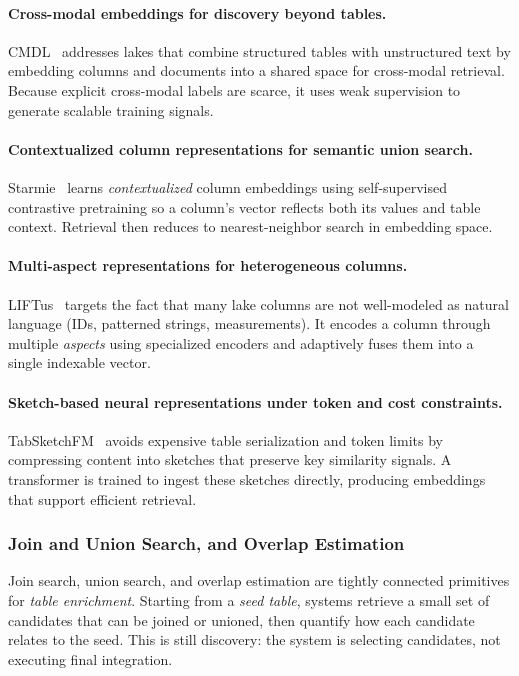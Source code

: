 \documentclass[sigconf,nonacm]{acmart}
\begin{document}
\paragraph{Cross-modal embeddings for discovery beyond tables.}
CMDL~\cite{10.14778/3611479.3611533} addresses lakes that combine structured tables with unstructured text by embedding columns and documents into a shared space for cross-modal retrieval. Because explicit cross-modal labels are scarce, it uses weak supervision to generate scalable training signals.

\paragraph{Contextualized column representations for semantic union search.}
Starmie~\cite{10.14778/3587136.3587146} learns \emph{contextualized} column embeddings using self-supervised contrastive pretraining so a column's vector reflects both its values and table context. Retrieval then reduces to nearest-neighbor search in embedding space.

\paragraph{Multi-aspect representations for heterogeneous columns.}
LIFTus~\cite{11113165} targets the fact that many lake columns are not well-modeled as natural language (IDs, patterned strings, measurements). It encodes a column through multiple \emph{aspects} using specialized encoders and adaptively fuses them into a single indexable vector.

\paragraph{Sketch-based neural representations under token and cost constraints.}
TabSketchFM~\cite{11113110} avoids expensive table serialization and token limits by compressing content into sketches that preserve key similarity signals. A transformer is trained to ingest these sketches directly, producing embeddings that support efficient retrieval.

\subsubsection{Join and Union Search, and Overlap Estimation}
Join search, union search, and overlap estimation are tightly connected primitives for \emph{table enrichment}. Starting from a \emph{seed table}, systems retrieve a small set of candidates that can be joined or unioned, then quantify how each candidate relates to the seed. This is still discovery: the system is selecting candidates, not executing final integration.
\end{document}
